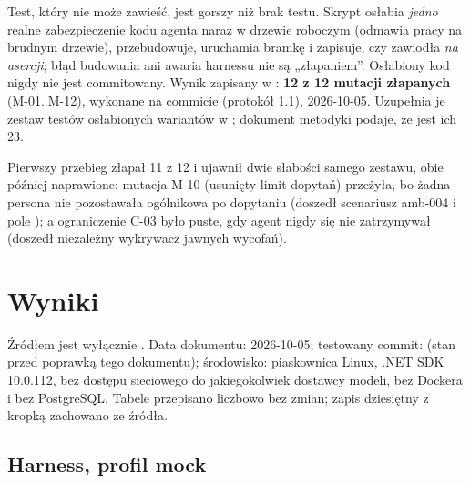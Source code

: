 Test, który nie może zawieść, jest gorszy niż brak testu. Skrypt  osłabia \emph{jedno} realne zabezpieczenie kodu agenta naraz w drzewie roboczym (odmawia pracy na brudnym drzewie), przebudowuje, uruchamia bramkę i zapisuje, czy zawiodła \emph{na asercji}; błąd budowania ani awaria harnessu nie są „złapaniem”. Osłabiony kod nigdy nie jest commitowany. Wynik zapisany w : \textbf{12 z 12 mutacji złapanych} (M-01..M-12), wykonane na commicie  (protokół 1.1), 2026-10-05. Uzupełnia je zestaw testów osłabionych wariantów w ; dokument metodyki podaje, że jest ich 23.

Pierwszy przebieg złapał 11 z 12 i ujawnił dwie słabości samego zestawu, obie później naprawione: mutacja M-10 (usunięty limit dopytań) przeżyła, bo żadna persona nie pozostawała ogólnikowa po dopytaniu (doszedł scenariusz amb-004 i pole ); a ograniczenie C-03 było puste, gdy agent nigdy się nie zatrzymywał (doszedł niezależny wykrywacz jawnych wycofań).


\section{Wyniki}
\label{sec:p4-wyniki}

Źródłem jest wyłącznie . Data dokumentu: 2026-10-05; testowany commit:  (stan  przed poprawką tego dokumentu); środowisko: piaskownica Linux, .NET SDK 10.0.112, bez dostępu sieciowego do jakiegokolwiek dostawcy modeli, bez Dockera i bez PostgreSQL. Tabele przepisano liczbowo bez zmian; zapis dziesiętny z kropką zachowano ze źródła.

\subsection{Harness, profil mock}

